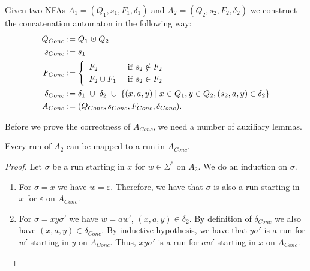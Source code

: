 \begin{definition}
   Given two NFAs
    $A_1=(Q_1, s_1, F_1, \delta_1)$ and $A_2=(Q_2, s_2, F_2, \delta_2)$ 
    we construct the concatenation automaton in the following way:
    \begin{align*}
        Q_{Conc} &:= Q_1 \; \dotcup \; Q_2 \\
        s_{Conc} &:= s_1 \\
        F_{Conc} &:= 
            \begin{cases}
                \begin{array}{ll}
                    F_2 & \mbox{ if } s_2 \notin F_2 \\
                    F_2 \cup F_1 & \mbox{ if } s_2 \in F_2
                \end{array}
            \end{cases}
        \\ %
        \delta_{Conc} &:= \delta_1 \; \cup \; \delta_2 \; \cup \; 
                         \{(x, a, y) \; | \; x \in Q_1, y \in Q_2, (s_2, a, y) \in \delta_2 \} \\
        A_{Conc} &:= (Q_{Conc}, s_{Conc}, F_{Conc}, \delta_{Conc}).
    \end{align*}
\end{definition}


Before we prove the correctness of $A_{Conc}$, we need a number of auxiliary lemmas.

\begin{lemma}
    \label{nfa_conc_cont}
    Every run of $A_2$ can be mapped to a run in $A_{Conc}$.
\end{lemma}
\begin{proof}
    Let $\sigma$ be a run starting in $x$ for $w \in \Sigma^*$ on $A_2$.
    We do an induction on $\sigma$.
    \begin{enumerate}
        \item 
            For $\sigma = x$
            we have $w = \varepsilon$.
            Therefore, we have that $\sigma$ is also a run starting in $x$ for $\varepsilon$ on $A_{Conc}$.
        \item
            For $\sigma = xy\sigma'$ we have $w = aw'$, $(x, a, y) \in \delta_2$.
            By definition of $\delta_{Conc}$ we also have $(x, a, y) \in \delta_{Conc}$.
            By inductive hypothesis, we have that $y\sigma'$ is a run for $w'$ starting in $y$ on $A_{Conc}$.
            Thus, $xy\sigma'$ is a run for $aw'$ starting in $x$ on $A_{Conc}$.
    \end{enumerate}
\end{proof}

